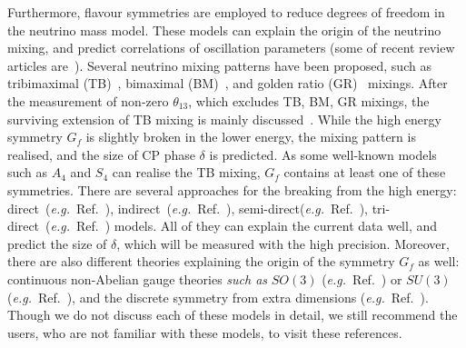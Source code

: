 \documentclass[aps,prd,nofootinbib,preprint]{revtex4}
\begin{document}
Furthermore, flavour symmetries are employed to reduce degrees of freedom in the neutrino mass model. These models can explain the origin of the neutrino mixing, and predict correlations of oscillation parameters (some of recent review articles are~\cite{Altarelli:2010gt,Ishimori:2010au,King:2013eh,King:2014nza,King:2015aea,King:2015ata,King:2017guk}). {\color{blue}
Several neutrino mixing patterns have been proposed, such as tribimaximal (TB)~\cite{Harrison:2002er,Xing:2002sw}, bimaximal (BM)~\cite{Fukugita:1998vn,Barger:1998ta,Davidson:1998bi}, and golden ratio (GR)~\cite{Datta:2003qg,Everett:2008et,Feruglio:2011qq} mixings. After the measurement of non-zero $\theta_{13}$, which excludes TB, BM, GR mixings, the surviving extension of TB mixing is mainly discussed~\cite{Harrison:2002er,King:2007pr,Pakvasa:2007zj}.
While the high energy symmetry $G_f$ is slightly broken in the lower energy, the mixing pattern is realised, and the size of CP phase $\delta$ is predicted. 
As some well-known models such as $A_4$ and $S_4$ can realise the TB mixing, $G_f$ contains at least one of these symmetries. There are several approaches for the breaking from the high energy: direct~(\textit{e.g.}~Ref.~\cite{King:2013eh}), indirect~(\textit{e.g.}~Ref.~\cite{King:2013eh}), semi-direct(\textit{e.g.}~Ref.~\cite{Holthausen:2012dk,Feruglio:2012cw,Feruglio:2013hia,Ding:2013hpa,Ding:2013bpa}), tri-direct~(\textit{e.g.}~Ref.~\cite{Ding:2018fyz,Ding:2018tuj}) models. All of they can explain the current data well, and predict the size of $\delta$, which will be measured with the high precision. Moreover, there are also different theories explaining the origin of the symmetry $G_f$ as well: continuous non-Abelian gauge theories \textit{such as} $SO(3)$ (\textit{e.g.}~Ref.~\cite{King:2005bj}) or $SU(3)$ (\textit{e.g.}~Ref.~\cite{King:2001uz,King:2003rf}), and the discrete symmetry from extra dimensions (\textit{e.g.}~Ref.~\cite{Feruglio:2017spp,Criado:2018thu,Penedo:2018nmg}).
%
Though we do not discuss each of these models in detail, we still recommend the users, who are not familiar with these models, to visit these references.
 }
 
\end{document}
